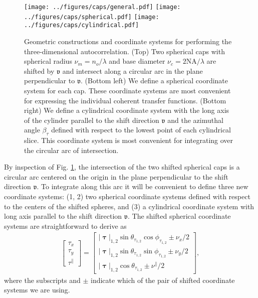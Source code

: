 \documentclass[]{osa-article}
\newcommand{\mypar}{\parallel}
\providecommand{\bs}[1]{\boldsymbol{#1}}
\providecommand{\bv}{\boldsymbol{\mathfrak{v}}}
\providecommand{\bvpar}{\nu^{\parallel}}
\providecommand{\bt}{\bs{\uptau}}
\providecommand{\btpar}{\tau^{\mypar}}
\begin{document}
\begin{figure}
  \centering
  \texttt{[image: ../figures/caps/general.pdf]}
  \texttt{[image: ../figures/caps/spherical.pdf]}\hspace{0.5em}
  \texttt{[image: ../figures/caps/cylindrical.pdf]}
  \caption{Geometric constructions and coordinate systems for performing the three-dimensional autocorrelation. (Top) Two spherical caps with spherical radius $\nu_m = n_o/\lambda$ and base diameter $\nu_c = 2\text{NA}/\lambda$ are shifted by $\bv$ and intersect along a circular arc in the plane perpendicular to $\bv$. (Bottom left) We define a spherical coordinate system for each cap. These coordinate systems  are most convenient for expressing the individual coherent transfer functions. (Bottom right) We define a cylindrical coordinate system with the long axis of the cylinder parallel to the shift direction $\bv$ and the azimuthal angle $\beta_\tau$ defined with respect to the lowest point of each cylindrical slice. This coordinate system is most convenient for integrating over the circular arc of intersection.}
  \label{fig:caps}
\end{figure}

By inspection of Fig. \ref{fig:caps}, the intersection of the two shifted spherical caps is a circular arc centered on the origin in the plane perpendicular to the shift direction $\bv$. To integrate along this arc it will be convenient to define three new coordinate systems: (1, 2) two spherical coordinate systems defined with respect to the centers of the shifted spheres, and (3) a cylindrical coordinate system with long axis parallel to the shift direction $\bv$. The shifted spherical coordinate systems are straightforward to derive as
\begin{align}
  \begin{bmatrix}
    \tau_x\\
    \tau_y\\
    \btpar
  \end{bmatrix}
  =
  \begin{bmatrix}
    |\bt|_{1,2}\sin\theta_{\tau_{1,2}}\cos\phi_{\tau_{1,2}} \pm \nu_x/2\\
    |\bt|_{1,2}\sin\theta_{\tau_{1,2}}\sin\phi_{\tau_{1,2}} \pm \nu_y/2\\
    |\bt|_{1,2}\cos\theta_{\tau_{1,2}} \pm \bvpar/2
  \end{bmatrix},\label{eq:spherical}
\end{align}
where the subscripts and $\pm$ indicate which of the pair of shifted coordinate systems we are using.
\end{document}
